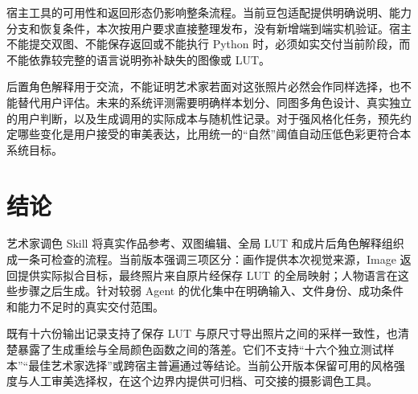 宿主工具的可用性和返回形态仍影响整条流程。当前豆包适配提供明确说明、能力分支和恢复条件，本次按用户要求直接整理发布，没有新增端到端实机验证。宿主不能提交双图、不能保存返回或不能执行 Python 时，必须如实交付当前阶段，而不能依靠较完整的语言说明弥补缺失的图像或 LUT。

后置角色解释用于交流，不能证明艺术家若面对这张照片必然会作同样选择，也不能替代用户评估。未来的系统评测需要明确样本划分、同图多角色设计、真实独立的用户判断，以及生成调用的实际成本与随机性记录。对于强风格化任务，预先约定哪些变化是用户接受的审美表达，比用统一的“自然”阈值自动压低色彩更符合本系统目标。

\section{结论}
艺术家调色 Skill 将真实作品参考、双图编辑、全局 LUT 和成片后角色解释组织成一条可检查的流程。当前版本强调三项区分：画作提供本次视觉来源，Image 返回提供实际拟合目标，最终照片来自原片经保存 LUT 的全局映射；人物语言在这些步骤之后生成。针对较弱 Agent 的优化集中在明确输入、文件身份、成功条件和能力不足时的真实交付范围。

既有十六份输出记录支持了保存 LUT 与原尺寸导出照片之间的采样一致性，也清楚暴露了生成重绘与全局颜色函数之间的落差。它们不支持“十六个独立测试样本”“最佳艺术家选择”或跨宿主普遍通过等结论。当前公开版本保留可用的风格强度与人工审美选择权，在这个边界内提供可归档、可交接的摄影调色工具。
